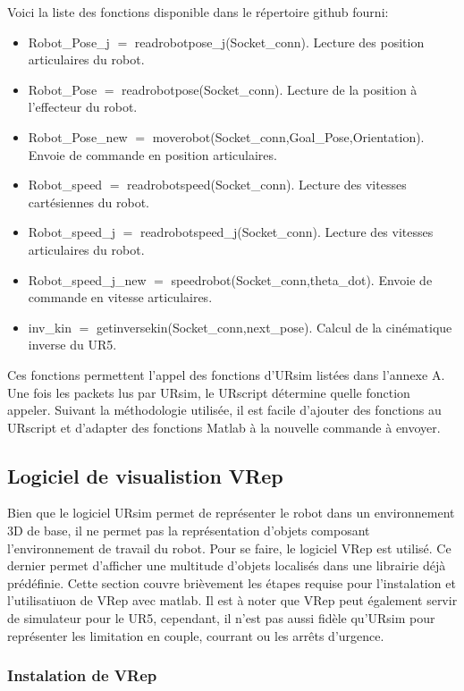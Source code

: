 \documentclass[root.tex]{subfiles}
\begin{document}
Voici la liste des fonctions disponible dans le répertoire github fourni: 
\begin{itemize}
\item Robot\_Pose\_j $=$ readrobotpose\_j(Socket\_conn).	Lecture des position articulaires du robot.
\item Robot\_Pose $=$ readrobotpose(Socket\_conn).			Lecture de la position à l'effecteur du robot.
\item Robot\_Pose\_new $=$ moverobot(Socket\_conn,Goal\_Pose,Orientation).	Envoie de commande en position articulaires.
\item Robot\_speed $=$ readrobotspeed(Socket\_conn).		Lecture des vitesses cartésiennes du robot.
\item Robot\_speed\_j $=$ readrobotspeed\_j(Socket\_conn).	Lecture des vitesses articulaires du robot.
\item Robot\_speed\_j\_new $=$ speedrobot(Socket\_conn,theta\_dot). Envoie de commande en vitesse articulaires.
\item inv\_kin $=$ getinversekin(Socket\_conn,next\_pose).	Calcul de la cinématique inverse du UR5.
\end{itemize}



Ces fonctions permettent l'appel des fonctions d'URsim listées dans l'annexe A.
Une fois les packets lus par URsim, le URscript détermine quelle fonction appeler.
Suivant la méthodologie utilisée, il est facile d'ajouter des fonctions au URscript et d'adapter des fonctions Matlab à la nouvelle commande à envoyer.

\subsection{Logiciel de visualistion VRep}

Bien que le logiciel URsim permet de représenter le robot dans un environnement 3D de base, il ne permet pas la représentation d'objets composant l'environnement de travail du robot.
Pour se faire, le logiciel VRep est utilisé.
Ce dernier permet d'afficher une multitude d'objets localisés dans une librairie déjà prédéfinie.
Cette section couvre brièvement les étapes requise pour l'instalation et l'utilisatiuon de VRep avec matlab.
Il est à noter que VRep peut également servir de simulateur pour le UR5, cependant, il n'est pas aussi fidèle qu'URsim pour représenter les limitation en couple, courrant ou les arrêts d'urgence.

\subsubsection{Instalation de VRep}
\end{document}
